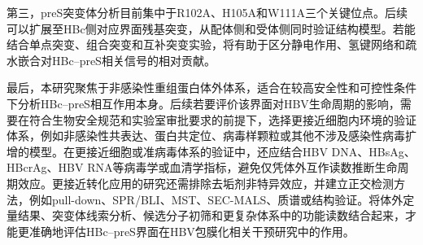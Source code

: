 第三，preS突变体分析目前集中于R102A、H105A和W111A三个关键位点。后续可以扩展至HBc侧对应界面残基突变，从配体侧和受体侧同时验证结构模型。若能结合单点突变、组合突变和互补突变实验，将有助于区分静电作用、氢键网络和疏水嵌合对HBc--preS相关信号的相对贡献。

最后，本研究聚焦于非感染性重组蛋白体外体系，适合在较高安全性和可控性条件下分析HBc--preS相互作用本身。后续若要评价该界面对HBV生命周期的影响，需要在符合生物安全规范和实验室审批要求的前提下，选择更接近细胞内环境的验证体系，例如非感染性共表达、蛋白共定位、病毒样颗粒或其他不涉及感染性病毒扩增的模型。在更接近细胞或准病毒体系的验证中，还应结合HBV DNA、HBsAg、HBcrAg、HBV RNA等病毒学或血清学指标，避免仅凭体外互作读数推断生命周期效应\cite{kramvis2022roadmap}。更接近转化应用的研究还需排除去垢剂非特异效应，并建立正交检测方法，例如pull-down、SPR/BLI、MST、SEC-MALS、质谱或结构验证。将体外定量结果、突变体线索分析、候选分子初筛和更复杂体系中的功能读数结合起来，才能更准确地评估HBc--preS界面在HBV包膜化相关干预研究中的作用。
